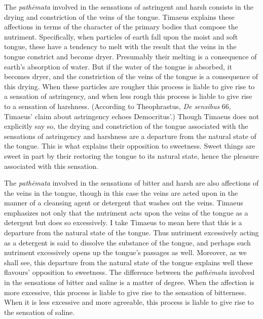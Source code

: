 The \emph{pathēmata} involved in the sensations of astringent and harsh consists in the drying and constriction of the veins of the tongue. Timaeus explains these affections in terms of the character of the primary bodies that compose the nutriment. Specifically, when particles of earth fall upon the moist and soft tongue, these have a tendency to melt with the result that the veins in the tongue constrict and become dryer. Presumably their melting is a consequence of earth's absorption of water. But if the water of the tongue is absorbed, it becomes dryer, and the constriction of the veins of the tongue is a consequence of this drying. When these particles are rougher this process is liable to give rise to a sensation of astringency, and when less rough this process is liable to give rise to a sensation of harshness. (According to Theophrastus, \emph{De sensibus} 66, Timaeus' claim about astringency echoes Democritus'.) Though Timaeus does not explicitly say so, the drying and constriction of the tongue associated with the sensations of astringency and harshness are a departure from the natural state of the tongue. This is what explains their opposition to sweetness. Sweet things are sweet in part by their restoring the tongue to its natural state, hence the pleasure associated with this sensation. 

The \emph{pathēmata} involved in the sensations of bitter and harsh are also affections of the veins in the tongue, though in this case the veins are acted upon in the manner of a cleansing agent or detergent that washes out the veins. Timaeus emphasizes not only that the nutriment acts upon the veins of the tongue as a detergent but does so excessively. I take Timaeus to mean here that this is a departure from the natural state of the tongue. Thus nutriment excessively acting as a detergent is said to dissolve the substance of the tongue, and perhaps such nutriment excessively opens up the tongue's passages as well. Moreover, as we shall see, this departure from the natural state of the tongue explains well these flavours' opposition to sweetness. The difference between the \emph{pathēmata} involved in the sensations of bitter and saline is a matter of degree. When the affection is more excessive, this process is liable to give rise to the sensation of bitterness. When it is less excessive and more agreeable, this process is liable to give rise to the sensation of saline.


